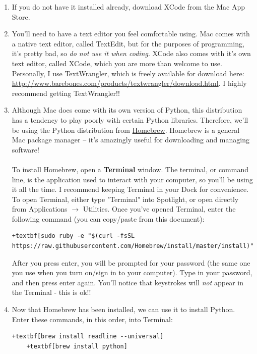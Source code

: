 \documentclass{article}
\begin{document}
\begin{enumerate}
	\item If you do not have it installed already, download XCode from the Mac App Store.
	
	\item You'll need to have a text editor you feel comfortable using. Mac comes with a native text editor, called TextEdit, but for the purposes of programming, it's pretty bad, so \emph{do not use it when coding}. XCode also comes with it's own text editor, called XCode, which you are more than welcome to use. Personally, I use TextWrangler, which is freely available for download here: \\ \href{http://www.barebones.com/products/textwrangler/download.html}{http://www.barebones.com/products/textwrangler/download.html}. I highly recommend getting TextWrangler!!
	
	\item Although Mac does come with its own version of Python, this distribution has a tendency to play poorly with certain Python libraries. Therefore, we'll be using the Python distribution from \href{https://brew.sh}{Homebrew}. Homebrew is a general Mac package manager -- it's amazingly useful for downloading and managing software! 
	\\\\
	To install Homebrew, open a \textbf{Terminal} window. The terminal, or command line, is the application used to interact with your computer, so you'll be using it all the time. I recommend keeping Terminal in your Dock for convenience. To open Terminal, either type "Terminal" into Spotlight, or open directly from Applications $\rightarrow$ Utilities. Once you've opened Terminal, enter the following command (you can copy/paste from this document):
	\begin{Verbatim}[fontsize=\small,xleftmargin=-2.5cm,commandchars=+\[\]]
		+textbf[sudo ruby -e "$(curl -fsSL https://raw.githubusercontent.com/Homebrew/install/master/install)"]
	\end{Verbatim}
	After you press enter, you will be prompted for your password (the same one you use when you turn on/sign in to your computer). Type in your password, and then press enter again. You'll notice that keystrokes will \emph{not} appear in the Terminal - this is ok!!
	
	\item Now that Homebrew has been installed, we can use it to install Python. Enter these commands, in this order, into Terminal: 
	\begin{Verbatim}[fontsize=\small,xleftmargin=-0.95cm,commandchars=+\[\]]
	+textbf[brew install readline --universal]
	+textbf[brew install python]
	\end{Verbatim}
	

\end{enumerate}
\end{document}

